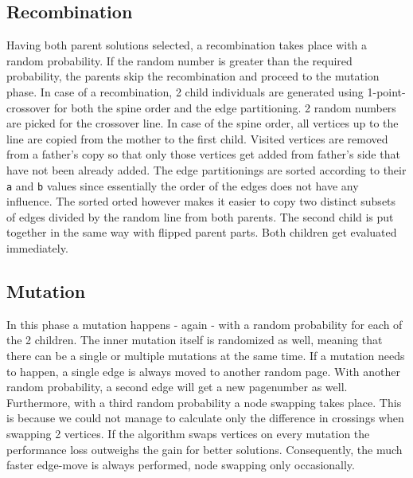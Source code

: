 \documentclass[11pt]{article}
\begin{document}
\subsection{Recombination}
\hspace{0.5cm}Having both parent solutions selected, a recombination takes place with a random probability. If the random number is greater than the required probability, the parents skip the recombination and proceed to the mutation phase. In case of a recombination, 2 child individuals are generated using 1-point-crossover for both the spine order and the edge partitioning. 2 random numbers are picked for the crossover line. In case of the spine order, all vertices up to the line are copied from the mother to the first child. Visited vertices are removed from a father's copy so that only those vertices get added from father's side that have not been already added. The edge partitionings are sorted according to their \texttt{a} and \texttt{b} values since essentially the order of the edges does not have any influence. The sorted orted however makes it easier to copy two distinct subsets of edges divided by the random line from both parents. The second child is put together in the same way with flipped parent parts. Both children get evaluated immediately.
\subsection{Mutation}
\hspace{0.5cm}In this phase a mutation happens - again - with a random probability for each of the 2 children. The inner mutation itself is randomized as well, meaning that there can be a single or multiple mutations at the same time. If a mutation needs to happen, a single edge is always moved to another random page. With another random probability, a second edge will get a new pagenumber as well. Furthermore, with a third random probability a node swapping takes place. This is because we could not manage to calculate only the difference in crossings when swapping 2 vertices. If the algorithm swaps vertices on every mutation the performance loss outweighs the gain for better solutions. Consequently, the much faster edge-move is always performed, node swapping only occasionally.   
\end{document}
